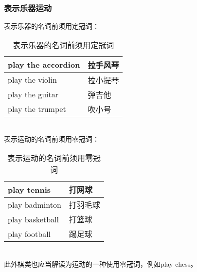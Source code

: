\documentclass[UTF8]{ctexart}
\newcommand{\littf}[1]{{\hspace{3pt}\ttfamily #1}}
\begin{document}
\subsubsection{表示乐器运动}
    表示乐器的名词前须用定冠词：\vspace{5pt}
    \begin{table}[h!]
        \begin{center}
            \ttfamily
            \begin{tabular}{p{120pt}|p{60pt}}
                \hline
                play the accordion&拉手风琴\\ \hline
                play the violin&拉小提琴\\ \hline
                play the guitar&弹吉他\\ \hline
                play the trumpet&吹小号\\ \hline
            \end{tabular}
            \rmfamily
            \caption{表示乐器的名词前须用定冠词}
        \end{center}
    \end{table}\\
    表示运动的名词前须用零冠词：\vspace{5pt}
    \begin{table}[h!]
        \begin{center}
            \ttfamily
            \begin{tabular}{p{120pt}|p{60pt}}
                \hline
                play tennis&打网球\\ \hline
                play badminton&打羽毛球\\ \hline
                play basketball&打篮球\\ \hline
                play football&踢足球\\ \hline
            \end{tabular}
            \rmfamily
            \caption{表示运动的名词前须用零冠词}
        \end{center}
    \end{table}\\
    此外棋类也应当解读为运动的一种使用零冠词，例如\littf{play chess}。

\newpage
\end{document}
